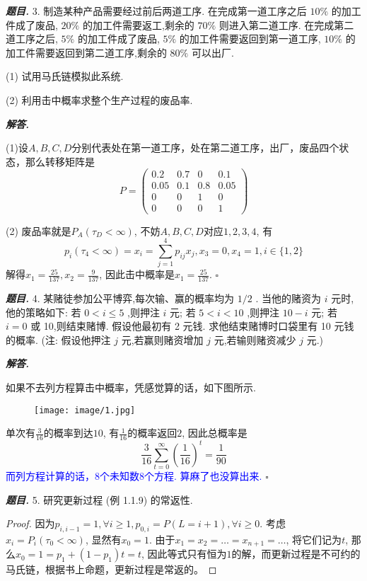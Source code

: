 \documentclass[10pt, a4paper, oneside]{ctexart}
\newenvironment{problem}{\begin{framed}\par\noindent\textbf{\textit{题目. }}}{\end{framed}\par}
\newenvironment{solution}{%
  \par\noindent\textbf{\textit{解答. }}\ignorespaces
}{%
  \hfill\ensuremath{\square}\par %
}
\begin{document}
\begin{problem}
    3. 制造某种产品需要经过前后两道工序. 在完成第一道工序之后 \( {10}\%  \) 的加工件成了废品, \( {20}\%  \) 的加工件需要返工,剩余的 \( {70}\%  \) 则进入第二道工序. 在完成第二道工序之后, \( 5\%  \) 的加工件成了废品, \( 5\%  \) 的加工件需要返回到第一道工序, \( {10}\%  \) 的加工件需要返回到第二道工序,剩余的 \( {80}\%  \) 可以出厂.

(1) 试用马氏链模拟此系统.

(2) 利用击中概率求整个生产过程的废品率.
\end{problem}
\begin{solution}
    (1)设$A,B,C,D$分别代表处在第一道工序，处在第二道工序，出厂，废品四个状态，那么转移矩阵是
    $$P=\begin{pmatrix}
        0.2 & 0.7 & 0 &0.1 \\ 0.05 & 0.1 & 0.8 & 0.05 \\ 0 & 0 & 1 & 0 \\ 0 & 0& 0& 1
    \end{pmatrix}$$

    (2) 废品率就是$P_A(\tau_D<\infty)$, 不妨$A,B,C,D$对应$1,2,3,4$, 有 
    $$p_i(\tau_4<\infty)=x_i=\sum_{j=1}^4p_{ij}x_j, x_3=0,x_4=1, i\in \{1,2\}$$
    解得$x_1=\frac{25}{137}, x_2=\frac{9}{137}$, 因此击中概率是$x_1=\frac{25}{137}$.
\end{solution}

\begin{problem}
    4. 某赌徒参加公平博弈,每次输、赢的概率均为 \( 1/2 \) . 当他的赌资为 \( i \) 元时,他的策略如下: 若 \( 0 < i \leq  5 \) ,则押注 \( i \) 元; 若 \( 5 < i < {10} \) ,则押注 \( {10} - i \) 元; 若 \( i = 0 \) 或 10,则结束赌博. 假设他最初有 2 元钱. 求他结束赌博时口袋里有 10 元钱的概率. (注: 假设他押注 \( j \) 元,若赢则赌资增加 \( j \) 元,若输则赌资减少 \( j \) 元.)
\end{problem}
\begin{solution}
    如果不去列方程算击中概率，凭感觉算的话，如下图所示.
    \begin{figure}[h]
        \centering
        \texttt{[image: image/1.jpg]}
    \end{figure}
    单次有$\frac{3}{16}$的概率到达$10$, 有$\frac{1}{16}$的概率返回$2$, 因此总概率是
    $$\frac{3}{16}\sum_{t=0}^{\infty} (\frac{1}{16})^t=\frac{1}{90}$$
    \textcolor{blue}{而列方程计算的话，$8$个未知数$8$个方程. 算麻了也没算出来.}
\end{solution}

\begin{problem}
    5. 研究更新过程 (例 1.1.9) 的常返性.
\end{problem}
\begin{proof}
    因为$p_{i,i-1}=1, \forall i\geq 1, p_{0,i}=P(L=i+1), \forall i\geq 0$. 考虑$x_i=P_i(\tau_0<\infty)$, 显然有$x_0=1$. 由于$x_1=x_2=\dots=x_{n+1}=\dots$, 将它们记为$t$, 那么$x_0=1=p_1+(1-p_1)t=t$, 因此等式只有恒为$1$的解，而更新过程是不可约的马氏链，根据书上命题，更新过程是常返的。
\end{proof}
\end{document}
